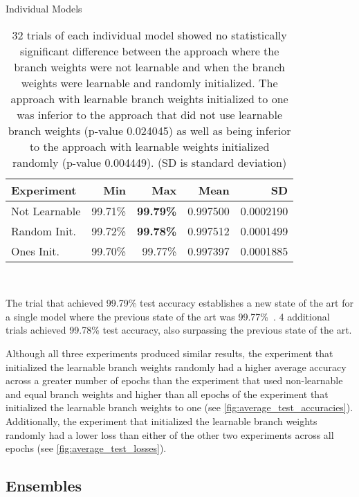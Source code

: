 \documentclass{article}
\begin{document}
\begin{table}[!htbp]
  \centering
  \begin{minipage}{.66\textwidth}
    \caption{Individual Models}
    \begin{tabularx}{\textwidth}{@{}Xrrrr@{}}
      \toprule
	      Experiment &Min &Max &Mean &SD \\
      \midrule
	      Not Learnable &99.71\% &\textbf{99.79\%} &0.997500 &0.0002190 \\
	      Random Init. &99.72\% &\textbf{99.78\%} &0.997512 &0.0001499 \\
	      Ones Init. &99.70\% &99.77\% &0.997397 &0.0001885 \\
      \bottomrule
    \end{tabularx}\\\label{tab:individual_models}
    \captionsetup{justification=justified,singlelinecheck=false}
    \caption*{32 trials of each individual model showed no statistically significant difference between the approach where the branch weights were not learnable and when the branch weights were learnable and randomly initialized.  The approach with learnable branch weights initialized to one was inferior to the approach that did not use learnable branch weights (p-value 0.024045) as well as being inferior to the approach with learnable weights initialized randomly (p-value 0.004449).  (SD is standard deviation)}
  \end{minipage}
\end{table}

The trial that achieved 99.79\% test accuracy establishes a new state of the art for a single model where the previous state of the art was 99.77\%~\cite{Sato2015}.  4 additional trials achieved 99.78\% test accuracy, also surpassing the previous state of the art.

Although all three experiments produced similar results, the experiment that initialized the learnable branch weights randomly had a higher average accuracy across a greater number of epochs than the experiment that used non-learnable and equal branch weights and higher than all epochs of the experiment that initialized the learnable branch weights to one (see \autoref{fig:average_test_accuracies}).  Additionally, the experiment that initialized the learnable branch weights randomly had a lower loss than either of the other two experiments across all epochs (see \autoref{fig:average_test_losses}).

\subsection{Ensembles}
\end{document}
